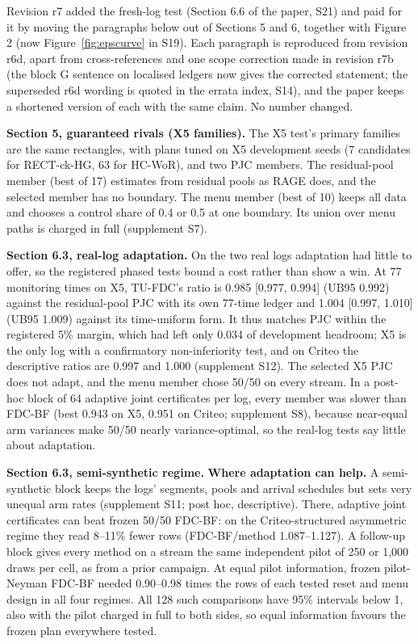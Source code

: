 \documentclass[sigconf,anonymous,review]{acmart}
\begin{document}
Revision r7 added the fresh-log test (Section 6.6 of the paper, S21) and paid for it by moving the paragraphs below out of Sections 5 and 6, together with Figure 2 (now Figure~\ref{fig:epscurve} in S19). Each paragraph is reproduced from revision r6d, apart from cross-references and one scope correction made in revision r7b (the block G sentence on localised ledgers now gives the corrected statement; the superseded r6d wording is quoted in the errata index, S14), and the paper keeps a shortened version of each with the same claim. No number changed.

\textbf{Section 5, guaranteed rivals (X5 families).} The X5 test's primary families are the same rectangles, with plans tuned on X5 development seeds (7 candidates for RECT-ck-HG, 63 for HC-WoR), and two PJC members. The residual-pool member (best of 17) estimates from residual pools as RAGE does, and the selected member has no boundary. The menu member (best of 10) keeps all data and chooses a control share of 0.4 or 0.5 at one boundary. Its union over menu paths is charged in full (supplement S7).

\textbf{Section 6.3, real-log adaptation.} On the two real logs adaptation had little to offer, so the registered phased tests bound a cost rather than show a win. At 77 monitoring times on X5, TU-FDC's ratio is 0.985 [0.977, 0.994] (UB95 0.992) against the residual-pool PJC with its own 77-time ledger and 1.004 [0.997, 1.010] (UB95 1.009) against its time-uniform form. It thus matches PJC within the registered 5\% margin, which had left only 0.034 of development headroom; X5 is the only log with a confirmatory non-inferiority test, and on Criteo the descriptive ratios are 0.997 and 1.000 (supplement S12). The selected X5 PJC does not adapt, and the menu member chose 50/50 on every stream. In a post-hoc block of 64 adaptive joint certificates per log, every member was slower than FDC-BF (best 0.943 on X5, 0.951 on Criteo; supplement S8), because near-equal arm variances make 50/50 nearly variance-optimal, so the real-log tests say little about adaptation.

\textbf{Section 6.3, semi-synthetic regime.} \textbf{Where adaptation can help.} A semi-synthetic block keeps the logs' segments, pools and arrival schedules but sets very unequal arm rates (supplement S11; post hoc, descriptive). There, adaptive joint certificates can beat frozen 50/50 FDC-BF: on the Criteo-structured asymmetric regime they read 8--11\% fewer rows (FDC-BF/method 1.087--1.127). A follow-up block gives every method on a stream the same independent pilot of 250 or 1,000 draws per cell, as from a prior campaign. At equal pilot information, frozen pilot-Neyman FDC-BF needed 0.90--0.98 times the rows of each tested reset and menu design in all four regimes. All 128 such comparisons have 95\% intervals below 1, also with the pilot charged in full to both sides, so equal information favours the frozen plan everywhere tested.
\end{document}
